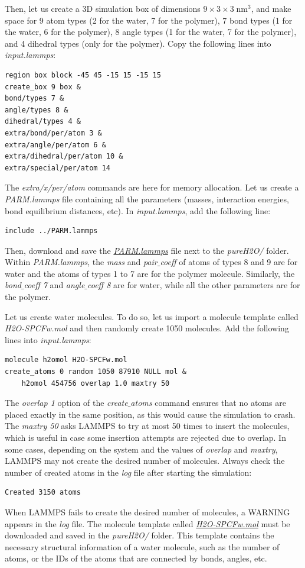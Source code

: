 \documentclass[9pt,tutorial]{livecoms}
\begin{document}
Then, let us create a 3D simulation box of dimensions $9 \times 3 \times 3 \; \text{nm}^3$, and make space for 9 atom types (2 for the water, 7 for the polymer), 7 bond types (1 for the water, 6 for the polymer), 8 angle types (1 for the water, 7 for the polymer), and 4 dihedral types (only for the polymer). Copy the following lines into \textit{input.lammps}:
{\normalsize \begin{verbatim}
region box block -45 45 -15 15 -15 15
create_box 9 box &
bond/types 7 &
angle/types 8 &
dihedral/types 4 &
extra/bond/per/atom 3 &
extra/angle/per/atom 6 &
extra/dihedral/per/atom 10 &
extra/special/per/atom 14
\end{verbatim}}
The \textit{extra/x/per/atom} commands are here for
memory allocation. 
Let us create a \textit{PARM.lammps} file containing all the parameters (masses, interaction energies, bond equilibrium
distances, etc). In \textit{input.lammps}, add the following line:
{\normalsize \begin{verbatim}
include ../PARM.lammps
\end{verbatim}}
Then, download and save the \href{https://raw.githubusercontent.com/lammpstutorials/lammpstutorials-article/main/files/tutorial3/PARM.lammps}{\textit{PARM.lammps}} file next to the \textit{pureH2O/} folder. Within \textit{PARM.lammps}, the \textit{mass} and \textit{pair$\_$coeff} of atoms of types 8 and 9 are for water and the atoms of types 1 to 7 are for the polymer molecule. Similarly, the \textit{bond$\_$coeff 7} and \textit{angle$\_$coeff 8} are for water, while all the other parameters are for the polymer.

Let us create water molecules. To do so, let us import a molecule template called
\textit{H2O-SPCFw.mol} and then randomly create 1050 molecules. Add the following lines into \textit{input.lammps}:
{\normalsize \begin{verbatim}
molecule h2omol H2O-SPCFw.mol
create_atoms 0 random 1050 87910 NULL mol &
    h2omol 454756 overlap 1.0 maxtry 50
\end{verbatim}}
The \textit{overlap 1} option of the \textit{create$\_$atoms} command ensures that no atoms are placed exactly in the same position, as this would cause the simulation to crash. The \textit{maxtry 50} asks LAMMPS to try at most 50 times to insert the molecules, which is useful in case some insertion attempts are rejected due to overlap. In some cases, depending on the system and the values of \textit{overlap} and \textit{maxtry}, LAMMPS may not create the desired number of molecules. Always check the number of created atoms in the \textit{log} file after starting the simulation:
{\normalsize \begin{verbatim}
Created 3150 atoms
\end{verbatim}}
When LAMMPS fails to create the desired number of molecules, a WARNING appears in the \textit{log} file. The molecule template called \href{https://raw.githubusercontent.com/lammpstutorials/lammpstutorials-article/main/files/tutorial3/H2O-SPCFw.mol}{\textit{H2O-SPCFw.mol}} must be downloaded and saved in the \textit{pureH2O/} folder. This template contains the necessary structural information of a water molecule, such as the number of atoms, or the IDs of the atoms that are connected by bonds, angles, etc.
\end{document}
